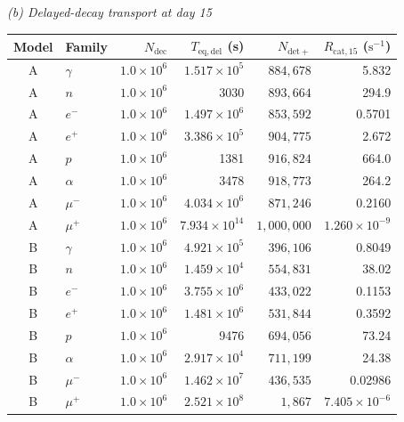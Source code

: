 \documentclass[11pt]{article}
\begin{document}
\begin{table}[!htbp]
\vspace{0.45em}
\noindent\textit{(b) Delayed-decay transport at day 15}\par\vspace{0.20em}
\begin{tabular}{clrrrr}
\toprule
Model & Family & $N_{\mathrm{dec}}$ & $T_{\mathrm{eq,del}}$ (s)
& $N_{\mathrm{det+}}$ & $R_{\mathrm{cat},15}$ ($\mathrm{s^{-1}}$) \\
\midrule
A & $\gamma$ & $1.0\times10^6$ & $1.517\times10^5$ & $884{,}678$ & 5.832 \\
A & $n$ & $1.0\times10^6$ & 3030 & $893{,}664$ & 294.9 \\
A & $e^-$ & $1.0\times10^6$ & $1.497\times10^6$ & $853{,}592$ & 0.5701 \\
A & $e^+$ & $1.0\times10^6$ & $3.386\times10^5$ & $904{,}775$ & 2.672 \\
A & $p$ & $1.0\times10^6$ & 1381 & $916{,}824$ & 664.0 \\
A & $\alpha$ & $1.0\times10^6$ & 3478 & $918{,}773$ & 264.2 \\
A & $\mu^-$ & $1.0\times10^6$ & $4.034\times10^6$ & $871{,}246$ & 0.2160 \\
A & $\mu^+$ & $1.0\times10^6$ & $7.934\times10^{14}$ & $1{,}000{,}000$ & $1.260\times10^{-9}$ \\
\addlinespace[0.25em]
B & $\gamma$ & $1.0\times10^6$ & $4.921\times10^5$ & $396{,}106$ & 0.8049 \\
B & $n$ & $1.0\times10^6$ & $1.459\times10^4$ & $554{,}831$ & 38.02 \\
B & $e^-$ & $1.0\times10^6$ & $3.755\times10^6$ & $433{,}022$ & 0.1153 \\
B & $e^+$ & $1.0\times10^6$ & $1.481\times10^6$ & $531{,}844$ & 0.3592 \\
B & $p$ & $1.0\times10^6$ & 9476 & $694{,}056$ & 73.24 \\
B & $\alpha$ & $1.0\times10^6$ & $2.917\times10^4$ & $711{,}199$ & 24.38 \\
B & $\mu^-$ & $1.0\times10^6$ & $1.462\times10^7$ & $436{,}535$ & 0.02986 \\
B & $\mu^+$ & $1.0\times10^6$ & $2.521\times10^8$ & $1{,}867$ & $7.405\times10^{-6}$ \\
\bottomrule
\end{tabular}

\end{table}
\endgroup
\end{document}
